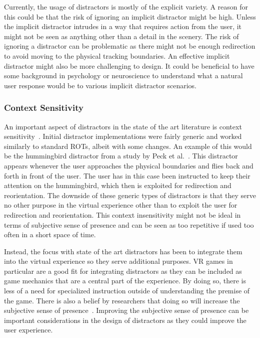 Currently, the usage of distractors is mostly of the explicit variety. A reason for this could be that the risk of ignoring an implicit distractor might be high. Unless the implicit distractor intrudes in a way that requires action from the user, it might not be seen as anything other than a detail in the scenery. The risk of ignoring a distractor can be problematic as there might not be enough redirection to avoid moving to the physical tracking boundaries. An effective implicit distractor might also be more challenging to design. It could be beneficial to have some background in psychology or neuroscience to understand what a natural user response would be to various implicit distractor scenarios.  

\subsubsection{Context Sensitivity}
An important aspect of distractors in the state of the art literature is context sensitivity~\cite{chen2017towards, chen2017supporting, sra2018vmotion}. Initial distractor implementations were fairly generic and worked similarly to standard ROTs, albeit with some changes. An example of this would be the hummingbird distractor from a study by Peck et al.~\cite{peck2011evaluation}. This distractor appears whenever the user approaches the physical boundaries and flies back and forth in front of the user. The user has in this case been instructed to keep their attention on the hummingbird, which then is exploited for redirection and reorientation. The downside of these generic types of distractors is that they serve no other purpose in the virtual experience other than to exploit the user for redirection and reorientation. This context insensitivity might not be ideal in terms of subjective sense of presence and can be seen as too repetitive if used too often in a short space of time. 

Instead, the focus with state of the art distractors has been to integrate them into the virtual experience so they serve additional purposes. VR games in particular are a good fit for integrating distractors as they can be included as game mechanics that are a central part of the experience. By doing so, there is less of a need for specialized instruction outside of understanding the premise of the game. There is also a belief by researchers that doing so will increase the subjective sense of presence~\cite{chen2017supporting, sra2018vmotion}. Improving the subjective sense of presence can be important considerations in the design of distractors as they could improve the user experience. 

